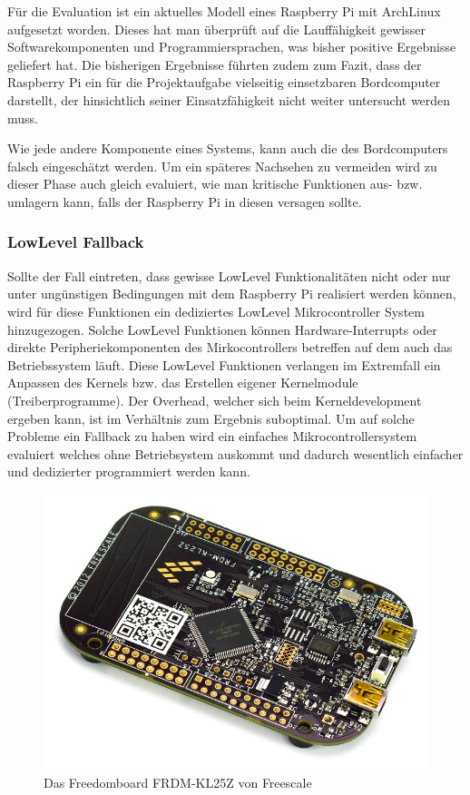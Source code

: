 Für die Evaluation ist ein aktuelles Modell eines Raspberry Pi mit
ArchLinux aufgesetzt worden. Dieses hat man überprüft auf die 
Lauffähigkeit gewisser Softwarekomponenten und Programmiersprachen,
was bisher positive Ergebnisse geliefert hat. Die bisherigen Ergebnisse
führten zudem zum Fazit, dass der Raspberry Pi ein für die Projektaufgabe
vielseitig einsetzbaren Bordcomputer darstellt, der hinsichtlich seiner
Einsatzfähigkeit nicht weiter untersucht werden muss.

Wie jede andere Komponente eines Systems, kann auch die des Bordcomputers
falsch eingeschätzt werden. Um ein späteres Nachsehen zu vermeiden wird
zu dieser Phase auch gleich evaluiert, wie man kritische Funktionen
aus- bzw. umlagern kann, falls der Raspberry Pi in diesen versagen sollte.

\subsubsection{LowLevel Fallback}
Sollte der Fall eintreten, dass gewisse LowLevel Funktionalitäten nicht
oder nur unter ungünstigen Bedingungen mit dem Raspberry Pi realisiert 
werden können, wird für diese Funktionen ein dediziertes LowLevel 
Mikrocontroller System hinzugezogen. Solche LowLevel Funktionen können
Hardware-Interrupts oder direkte Peripheriekomponenten des Mirkocontrollers
betreffen auf dem auch das Betriebssystem läuft. Diese LowLevel Funktionen
verlangen im Extremfall ein Anpassen des Kernels bzw. das Erstellen eigener
Kernelmodule (Treiberprogramme). Der Overhead, welcher sich beim 
Kerneldevelopment ergeben kann, ist im Verhältnis zum Ergebnis suboptimal. 
Um auf solche Probleme ein Fallback zu haben wird ein einfaches 
Mikrocontrollersystem evaluiert welches ohne Betriebsystem auskommt und
dadurch wesentlich einfacher und dedizierter programmiert werden kann.

\begin{figure}[h!]
	\centering
	\includegraphics[scale=1]{../../fig/frdm-kl25z.jpg}
	\caption{Das Freedomboard FRDM-KL25Z von Freescale}
\end{figure}

